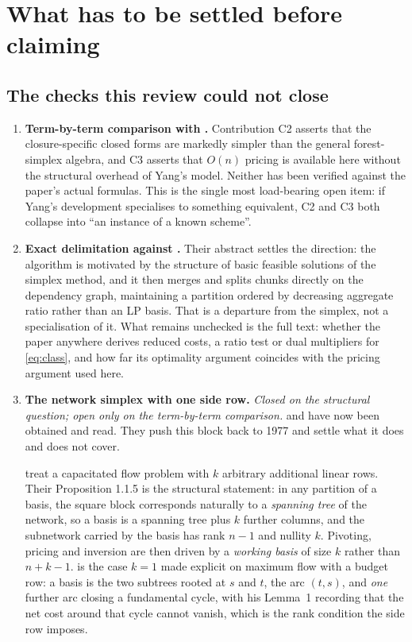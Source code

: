 \section{What has to be settled before claiming}\label{sec:open}

\subsection{The checks this review could not close}

\begin{enumerate}[label=Q\arabic*.,leftmargin=*]
\item \textbf{Term-by-term comparison with \citet{Yang2026}.} Contribution C2
      asserts that the closure-specific closed forms are markedly simpler than
      the general forest-simplex algebra, and C3 asserts that $O(n)$ pricing is
      available here without the structural overhead of Yang's model. Neither
      has been verified against the paper's actual formulas. This is the single
      most load-bearing open item: if Yang's development specialises to
      something equivalent, C2 and C3 both collapse into ``an instance of a
      known scheme''.
\item \textbf{Exact delimitation against \citet{MollakhaniEtAl2026}.} Their
      abstract settles the direction: the algorithm is motivated by the
      structure of basic feasible solutions of the simplex method, and it then
      merges and splits chunks directly on the dependency graph, maintaining a
      partition ordered by decreasing aggregate ratio rather than an LP basis.
      That is a departure from the simplex, not a specialisation of it. What
      remains unchecked is the full text: whether the paper anywhere derives
      reduced costs, a ratio test or dual multipliers for \eqref{eq:class}, and
      how far its optimality argument coincides with the pricing argument used
      here.
\item \textbf{The network simplex with one side row.} \emph{Closed on the
      structural question; open only on the term-by-term comparison.}
      \citet{ChenSaigal1977} and \citet{Caliskan2011} have now been obtained
      and read. They push this block back to 1977 and settle what it does and
      does not cover.

      \citet{ChenSaigal1977} treat a capacitated flow problem with $k$
      arbitrary additional linear rows. Their Proposition 1.1.5 is the
      structural statement: in any partition of a basis, the square block
      corresponds naturally to a \emph{spanning tree} of the network, so a basis
      is a spanning tree plus $k$ further columns, and the subnetwork carried by
      the basis has rank $n-1$ and nullity $k$. Pivoting, pricing and inversion
      are then driven by a \emph{working basis} of size $k$ rather than $n+k-1$.
      \citet{Caliskan2011} is the case $k=1$ made explicit on maximum flow with
      a budget row: a basis is the two subtrees rooted at $s$ and $t$, the arc
      $(t,s)$, and \emph{one} further arc closing a fundamental cycle, with his
      Lemma~1 recording that the net cost around that cycle cannot vanish, which
      is the rank condition the side row imposes.


\end{enumerate}
